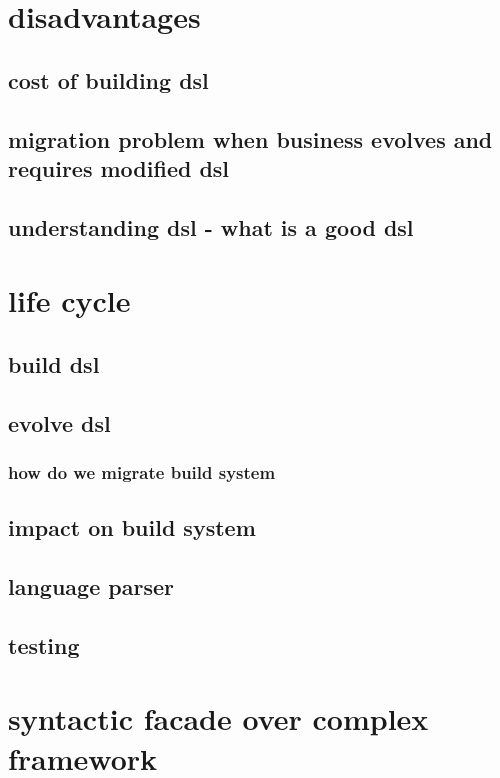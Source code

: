 \documentclass{article}
\begin{document}
\section{disadvantages}
\subsection{cost of building dsl }
\subsection{migration problem when business evolves and requires modified dsl}
\subsection{understanding dsl - what is a good dsl}
\section{life cycle }
\subsection{build dsl}
\subsection{evolve dsl}
\subsubsection{how do we migrate build system}
\subsection{impact on build system}
\subsection{language parser}
\subsection{testing}
\section{syntactic facade over complex framework }
\end{document}
